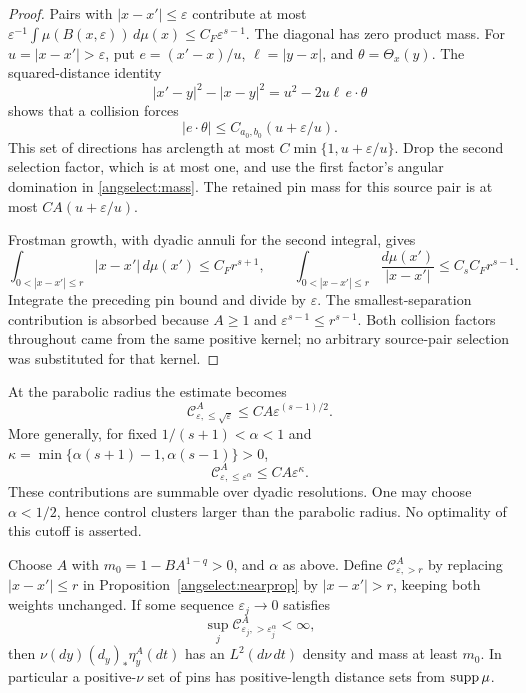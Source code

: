 \begin{proof}
Pairs with \(|x-x'|\le\varepsilon\) contribute at most
\(\varepsilon^{-1}\int\mu(B(x,\varepsilon))\,d\mu(x)
\le C_F\varepsilon^{s-1}\).
The diagonal has zero product mass. For
\(u=|x-x'|>\varepsilon\), put
\(e=(x'-x)/u\), \(\ell=|y-x|\), and \(\theta=\Theta_x(y)\).
The squared-distance identity
\[
 |x'-y|^2-|x-y|^2=u^2-2u\ell\,e\cdot\theta
\]
shows that a collision forces
\[
 |e\cdot\theta|\le C_{a_0,b_0}(u+\varepsilon/u).
\]
This set of directions has arclength at most
\(C\min\{1,u+\varepsilon/u\}\). Drop the second selection factor,
which is at most one, and use the first factor's angular domination in
\eqref{angselect:mass}. The retained pin mass for this source pair is
at most \(CA(u+\varepsilon/u)\).

Frostman growth, with dyadic annuli for the second integral, gives
\[
 \int_{0<|x-x'|\le r}|x-x'|\,d\mu(x')\le C_F r^{s+1},
 \qquad
 \int_{0<|x-x'|\le r}\frac{d\mu(x')}{|x-x'|}
 \le C_s C_F r^{s-1}.
\]
Integrate the preceding pin bound and divide by \(\varepsilon\).
The smallest-separation contribution is absorbed because
\(A\ge1\) and \(\varepsilon^{s-1}\le r^{s-1}\).
Both collision factors throughout came from the same positive kernel;
no arbitrary source-pair selection was substituted for that kernel.
\end{proof}

At the parabolic radius the estimate becomes
\begin{equation}\label{angselect:parabolic}
 \mathcal C^A_{\varepsilon,\le\sqrt\varepsilon}
 \le CA\varepsilon^{(s-1)/2}.
\end{equation}
More generally, for fixed
\(1/(s+1)<\alpha<1\) and
\(\kappa=\min\{\alpha(s+1)-1,\alpha(s-1)\}>0\),
\begin{equation}\label{angselect:power}
 \mathcal C^A_{\varepsilon,\le\varepsilon^\alpha}
 \le CA\varepsilon^\kappa.
\end{equation}
These contributions are summable over dyadic resolutions.
One may choose \(\alpha<1/2\), hence control clusters larger than
the parabolic radius. No optimality of this cutoff is asserted.

\begin{proposition}
\label{angselect:farcriterion}
Choose \(A\) with \(m_0=1-BA^{1-q}>0\), and \(\alpha\) as above.
Define \(\mathcal C^A_{\varepsilon,>r}\) by replacing
\(|x-x'|\le r\) in Proposition~\ref{angselect:nearprop} by
\(|x-x'|>r\), keeping both weights unchanged.
If some sequence \(\varepsilon_j\to0\) satisfies
\begin{equation}\label{angselect:farhyp}
 \sup_j\mathcal C^A_{\varepsilon_j,>\varepsilon_j^\alpha}<\infty,
\end{equation}
then \(\nu(dy)(d_y)_*\eta_y^A(dt)\) has an
\(L^2(d\nu\,dt)\) density and mass at least \(m_0\).
In particular a positive-\(\nu\) set of pins has positive-length
distance sets from \(\operatorname{supp}\mu\).
\end{proposition}

